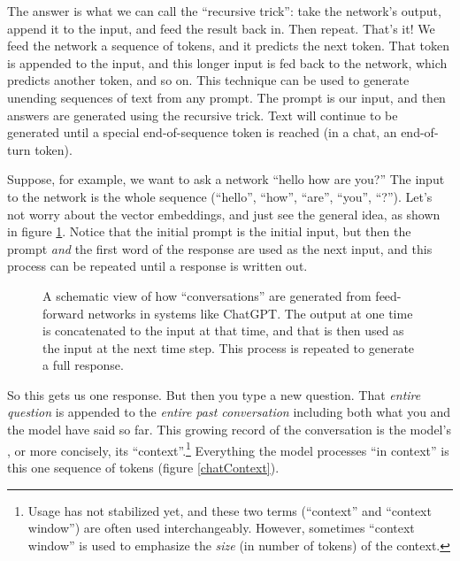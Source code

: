 The answer is what we can call the ``recursive trick'': take the network's
output, append it to the input, and feed the result back in. Then repeat.
That's it! We feed the network a sequence of tokens, and it predicts the next
token. That token is appended to the input, and this longer input is fed back
to the network, which predicts another token, and so on. This technique can be
used to generate unending sequences of text from any prompt. The prompt is our input, and
then answers are generated using the recursive trick. Text will continue to be
generated until a special end-of-sequence token is reached (in a chat, an
end-of-turn token).

Suppose, for example, we want to ask a network ``hello how are you?'' The input
to the network is the whole sequence (``hello'', ``how'', ``are'', ``you'',
``?''). Let's  not worry about the vector embeddings, and just see the
general idea, as shown in figure \ref{gptRecursedInputs}. Notice that the
initial prompt is the initial input, but then the prompt \emph{and} the first
word of the response are used as the next input, and this process can be
repeated until a response is written out.
  
\begin{figure}[ht]
\centering
{}
\caption[Jeff Yoshimi.]{A schematic view of how ``conversations'' are generated
from feed-forward networks in systems like ChatGPT. The output at one time is
concatenated to the input at that time, and that is then used as the input at
the next time step. This process is repeated to generate a full response.
}
\label{gptRecursedInputs}
\end{figure}

So this gets us one response. But then you type a new question. That
\emph{entire question} is appended to the \emph{entire past conversation}
including both what you and the model have said so far. This growing record of
the conversation is the model's , or more concisely,
its ``context''.\footnote{Usage has not stabilized yet, and these two terms
(``context'' and ``context window'') are often used interchangeably. However,
sometimes ``context window'' is used to emphasize the \emph{size} (in number of
tokens) of the context.} Everything the model processes ``in context'' is this
one sequence of tokens (figure \ref{chatContext}).

